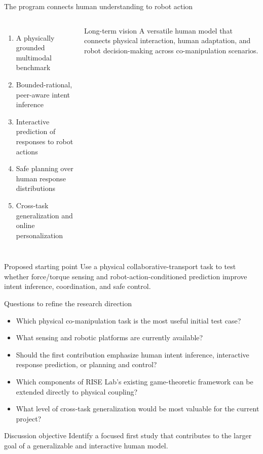 \documentclass[aspectratio=169,11pt]{beamer}
\begin{document}
\begin{frame}[shrink=5]{The program connects human understanding to robot action}
\begin{columns}[T,onlytextwidth]
\begin{enumerate}
  \item A physically grounded multimodal benchmark
  \item Bounded-rational, peer-aware intent inference
  \item Interactive prediction of responses to robot actions
  \item Safe planning over human response distributions
  \item Cross-task generalization and online personalization
\end{enumerate}
\begin{alertblock}{Long-term vision}
A versatile human model that connects physical interaction, human adaptation, and robot decision-making across co-manipulation scenarios.
\end{alertblock}
\end{columns}
\vspace{0.35cm}
\begin{block}{Proposed starting point}
Use a physical collaborative-transport task to test whether force/torque sensing and robot-action-conditioned prediction improve intent inference, coordination, and safe control.
\end{block}
\end{frame}

\begin{frame}{Questions to refine the research direction}
\begin{itemize}
  \item Which physical co-manipulation task is the most useful initial test case?
  \item What sensing and robotic platforms are currently available?
  \item Should the first contribution emphasize human intent inference, interactive response prediction, or planning and control?
  \item Which components of RISE Lab's existing game-theoretic framework can be extended directly to physical coupling?
  \item What level of cross-task generalization would be most valuable for the current project?
\end{itemize}
\vspace{0.35cm}
\begin{alertblock}{Discussion objective}
Identify a focused first study that contributes to the larger goal of a generalizable and interactive human model.
\end{alertblock}
\end{frame}
\end{document}
